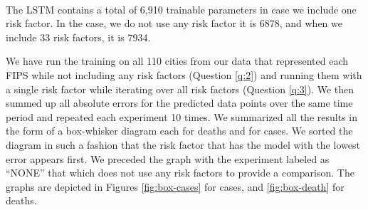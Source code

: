 \documentclass[a4paper, inpress]{jds} %
\renewcommand{\_}{%
    \textunderscore\hspace{0pt}%
}
\begin{document}
\begin{table}[!h]
    \caption{The deep learning parameters used for the model sweep
      creation in as exported by Keras using 1 risk factor. The
      activation function is RELU and the recurrent activation
      function is sigmoid.}
    \label{tab:model}
    \bigskip

    \settowidth{\rotheadsize}{Parameters\quad}

    \begin{footnotesize}
    \centering
     ~\\
    The LSTM contains a total of 6,910 trainable parameters in
    case we include one risk factor. In the case, we do not use any
    risk factor it is 6878, and when we include 33 risk factors, it is
    7934.
    \end{footnotesize}
\end{table}



We have run the training on all 110 cities from our data that
represented each FIPS while not including any risk factors (Question
\ref{q:2}) and running them with a single risk factor while iterating
over all risk factors (Question \ref{q:3}). We then summed up all
absolute errors for the predicted data points over the same time
period and repeated each experiment 10 times. We summarized all the
results in the form of a box-whisker diagram each for deaths and for
cases. We sorted the diagram in such a fashion that the risk factor
that has the model with the lowest error appears first. We preceded
the graph with the experiment labeled as ``NONE'' that which does not
use any risk factors to provide a comparison. The graphs are depicted
in Figures \ref{fig:box-cases} for cases, and \ref{fig:box-death} for
deaths.
\end{document}
